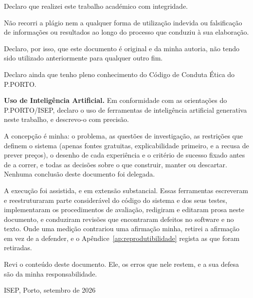 
\frontmatter
\pagestyle{plain}

\maketitlepage


\begin{soi}

\vspace{1cm}

Declaro que realizei este trabalho académico com integridade.

Não recorri a plágio nem a qualquer forma de utilização indevida ou falsificação de informações ou
resultados ao longo do processo que conduziu à sua elaboração.

Declaro, por isso, que este documento é original e da minha autoria, não tendo sido utilizado
anteriormente para qualquer outro fim.

Declaro ainda que tenho pleno conhecimento do Código de Conduta Ética do P.PORTO.

\vspace{0.5cm}

\textbf{Uso de Inteligência Artificial.} Em conformidade com as orientações do P.PORTO/ISEP,
declaro o uso de ferramentas de inteligência artificial generativa neste trabalho, e descrevo-o
com precisão.

A concepção é minha: o problema, as questões de investigação, as restrições que definem o sistema
(apenas fontes gratuitas, explicabilidade primeiro, e a recusa de prever preços), o desenho de
cada experiência e o critério de sucesso fixado antes de a correr, e todas as decisões sobre o que
construir, manter ou descartar. Nenhuma conclusão deste documento foi delegada.

A execução foi assistida, e em extensão substancial. Essas ferramentas escreveram e
reestruturaram parte considerável do código do sistema e dos seus testes, implementaram os
procedimentos de avaliação, redigiram e editaram prosa neste documento, e conduziram revisões que
encontraram defeitos no software e no texto. Onde uma medição contrariou uma afirmação minha,
retirei a afirmação em vez de a defender, e o Apêndice~\ref{ap:reprodutibilidade} regista as que
foram retiradas.

Revi o conteúdo deste documento. Ele, os erros que nele restem, e a sua defesa são da minha
responsabilidade.

\vspace{1cm}

ISEP, Porto, setembro de 2026

\end{soi}

